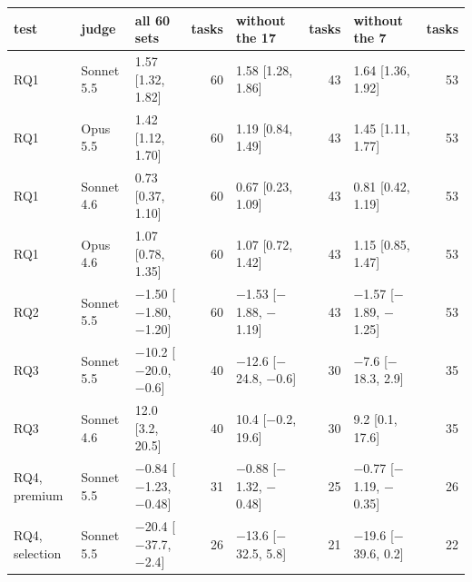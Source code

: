 {\scriptsize\setlength{\tabcolsep}{4pt}
\begin{tabular}{@{}lllrlrlr@{}}
\toprule
test & judge & all 60 sets & tasks & without the 17 & tasks & without the 7 & tasks \\
\midrule
RQ1 & Sonnet 5.5 & 1.57 [1.32, 1.82] & 60 & 1.58 [1.28, 1.86] & 43 & 1.64 [1.36, 1.92] & 53 \\
RQ1 & Opus 5.5 & 1.42 [1.12, 1.70] & 60 & 1.19 [0.84, 1.49] & 43 & 1.45 [1.11, 1.77] & 53 \\
RQ1 & Sonnet 4.6 & 0.73 [0.37, 1.10] & 60 & 0.67 [0.23, 1.09] & 43 & 0.81 [0.42, 1.19] & 53 \\
RQ1 & Opus 4.6 & 1.07 [0.78, 1.35] & 60 & 1.07 [0.72, 1.42] & 43 & 1.15 [0.85, 1.47] & 53 \\
RQ2 & Sonnet 5.5 & $-$1.50 [$-$1.80, $-$1.20] & 60 & $-$1.53 [$-$1.88, $-$1.19] & 43 & $-$1.57 [$-$1.89, $-$1.25] & 53 \\
RQ3 & Sonnet 5.5 & $-$10.2 [$-$20.0, $-$0.6] & 40 & $-$12.6 [$-$24.8, $-$0.6] & 30 & $-$7.6 [$-$18.3, 2.9] & 35 \\
RQ3 & Sonnet 4.6 & 12.0 [3.2, 20.5] & 40 & 10.4 [$-$0.2, 19.6] & 30 & 9.2 [0.1, 17.6] & 35 \\
RQ4, premium & Sonnet 5.5 & $-$0.84 [$-$1.23, $-$0.48] & 31 & $-$0.88 [$-$1.32, $-$0.48] & 25 & $-$0.77 [$-$1.19, $-$0.35] & 26 \\
RQ4, selection & Sonnet 5.5 & $-$20.4 [$-$37.7, $-$2.4] & 26 & $-$13.6 [$-$32.5, 5.8] & 21 & $-$19.6 [$-$39.6, 0.2] & 22 \\
\bottomrule
\end{tabular}}
